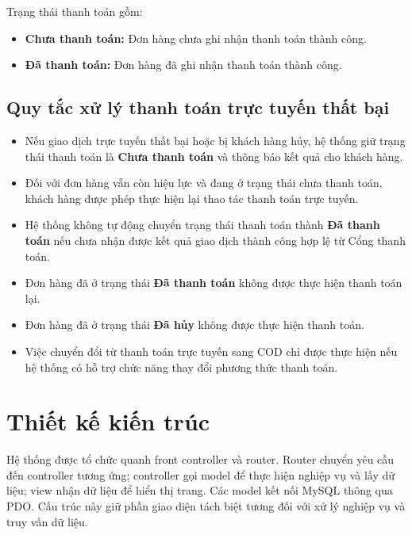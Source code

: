 Trạng thái thanh toán gồm:

\begin{itemize}
    \item \textbf{Chưa thanh toán:} Đơn hàng chưa ghi nhận thanh toán thành công.
    \item \textbf{Đã thanh toán:} Đơn hàng đã ghi nhận thanh toán thành công.
\end{itemize}

\subsection{Quy tắc xử lý thanh toán trực tuyến thất bại}

\begin{itemize}
    \item Nếu giao dịch trực tuyến thất bại hoặc bị khách hàng hủy, hệ thống giữ trạng thái thanh toán là \textbf{Chưa thanh toán} và thông báo kết quả cho khách hàng.

    \item Đối với đơn hàng vẫn còn hiệu lực và đang ở trạng thái chưa thanh toán, khách hàng được phép thực hiện lại thao tác thanh toán trực tuyến.

    \item Hệ thống không tự động chuyển trạng thái thanh toán thành \textbf{Đã thanh toán} nếu chưa nhận được kết quả giao dịch thành công hợp lệ từ Cổng thanh toán.

    \item Đơn hàng đã ở trạng thái \textbf{Đã thanh toán} không được thực hiện thanh toán lại.

    \item Đơn hàng đã ở trạng thái \textbf{Đã hủy} không được thực hiện thanh toán.

    \item Việc chuyển đổi từ thanh toán trực tuyến sang COD chỉ được thực hiện nếu hệ thống có hỗ trợ chức năng thay đổi phương thức thanh toán.
\end{itemize}
\section{Thiết kế kiến trúc}
Hệ thống được tổ chức quanh front controller và router. Router chuyển yêu cầu đến controller tương ứng; controller gọi model để thực hiện nghiệp vụ và lấy dữ liệu; view nhận dữ liệu để hiển thị trang. Các model kết nối MySQL thông qua PDO. Cấu trúc này giữ phần giao diện tách biệt tương đối với xử lý nghiệp vụ và truy vấn dữ liệu.


